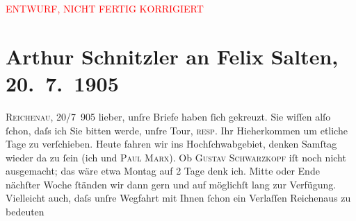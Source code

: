 
\begin{center}
            \textcolor{red}{ENTWURF, NICHT FERTIG KORRIGIERT}
                      \end{center}
            
         
         \renewcommand{\erwaehntePersonen}{Personen: Hermann Bahr, Paul Marx, Felix Salten, Paul Salten, Gustav Schwarzkopf}
         \renewcommand{\erwaehnteOrte}{Orte: Eisenerz, Hochschwab, Hotel Hochschwab, Kurhaus Rudolfsbad, Mariazell, Reichenau an der Rax, Weichselboden, Wien, Wildalpen}
         \renewcommand{\erwaehnteWerke}{Werke: Die Andere}
               \section[Arthur Schnitzler an Felix Salten, 20. 7. 1905]{ Arthur Schnitzler an Felix Salten, 20. 7. 1905}\nopagebreak{}\rehead{ }\begin{ledgroupsized}[t]{13cm}\normalsize\beginnumbering \toendnotes[C]{\smallbreak\pagebreak[2]} 
\toendnotes[C]{\smallbreak}\pstart
           \raggedleft{}{\pb}\textsc{Reichenau}, 20/7 905\pend
           \pstart
           lieber, unſre Briefe haben ſich gekreuzt. Sie wiſſen alſo ſchon,
               daſs ich Sie bitten werde, unſre Tour, \textsc{resp.} Ihr
               Hieherkommen um etliche Tage zu verſchieben. Heute fahren wir ins Hochſchwabgebiet, denken Samſtag wieder da zu
               ſein (ich und \textsc{Paul Marx}). Ob \textsc{Gustav Schwarzkopf} iſt noch nicht ausgemacht; das wäre etwa Montag auf 2 Tage denk ich. Mitte {\pb}oder Ende nächſter Woche ſtänden wir dann
               gern und auf möglichſt lang zur Verfügung. Vielleicht auch, daſs unſre Wegfahrt mit
               Ihnen ſchon ein Verlaſſen Reichenaus zu bedeuten

\end{ledgroupsized}
